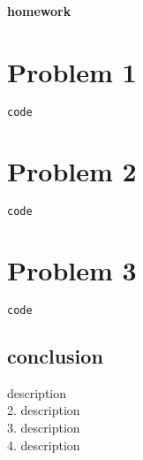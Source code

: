 \documentclass[UTF8]{ctexart}
\date{today}
\begin{document}
\textbf{homework}
		\section*{Problem 1}
\begin{lstlisting}[language= python ]
	code
		\end{lstlisting}
		\section*{Problem 2}
\begin{lstlisting}[language = python]
	code
\end{lstlisting}
		\section*{Problem 3}
\begin{lstlisting}[language = python]
	code
\end{lstlisting}
		\subsection*{conclusion}
		description\\
		\hspace*{7.2mm}2. description\\
		\hspace*{7.2mm}3. description\\
		\hspace*{7.2mm}4. description\\
\end{document}
